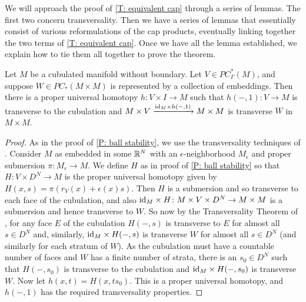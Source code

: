 We will approach the proof of \cref{T: equivalent cap} through a series of lemmas.
The first two concern transversality.
Then we have a series of lemmas that essentially consist of various reformulations of the cap products, eventually linking together the two terms of \cref{T: equivalent cap}.
Once we have all the lemma established, we explain how to tie them all together to prove the theorem.

\begin{comment}
	\begin{lemma}\red{REMOVE???:}
		Suppose $M$ is a cubulated manifold without boundary and $V \in PC^*_{\Gamma\pf}(M)$.
		Then $\id_M \times r_V \colon M \times V \to M \times M$ is transverse to the product cubulation of $M \times M$.
	\end{lemma}
	\begin{proof}
		Easy = see if I did this earlier somewhere
	\end{proof}

	\red{Note $\mc J$ commutes with $\Delta$ and switch them below.}
\end{comment}

\begin{lemma}\label{L: product transversal}
	Let $M$ be a cubulated manifold without boundary.
	Let $V \in PC^*_{\Gamma}(M)$, and suppose $W \in PC_*(M \times M)$ is represented by a collection of embeddings.
	Then there is a proper universal homotopy $h \colon V \times I \to M$ such that $h(-,1) \colon V \to M$ is transverse to the cubulation and $M \times V \xrightarrow{\mathrm{id}_M \times h(-,1)} M \times M$ is transverse $W$ in $M \times M$.
\end{lemma}

\begin{proof}
	As in the proof of \cref{P: ball stability}, we use the transversality techniques of \cite[Section 2.3]{GuPo74}.
	Consider $M$ as embedded in some $\mathbb{R}^N$ with an $\epsilon$-neighborhood $M_\epsilon$ and proper submersion $\pi \colon M_\epsilon \to M$.
	We define $H$ as in proof of \cref{P: ball stability} so that $H \colon V \times D^N \to M$ is the proper universal homotopy given by $H(x,s) = \pi(r_V(x)+\epsilon(x)s)$.
	Then $H$ is a submersion and so transverse to each face of the cubulation, and also $\mathrm{id}_M \times H \colon M \times V \times D^N \to M \times M$ is a submersion and hence transverse to $W$.
	So now by the Transversality Theorem of \cite[Section 2.3]{GuPo74}, for any face $E$ of the cubulation $H(-,s)$ is transverse to $E$ for almost all $s \in D^N$ and, similarly, $\mathrm{id}_M \times H(-,s)$ is transverse $W$ for almost all $s \in D^N$ (and similarly for each stratum of $W$).
	As the cubulation must have a countable number of faces and $W$ has a finite number of strata, there is an $s_0 \in D^N$ such that $H(-,s_0)$ is transverse to the cubulation and $\mathrm{id}_M \times H(-,s_0)$ is transverse $W$.
	Now let $h(x,t) = H(x,ts_0)$.
	This is a proper universal homotopy, and $h(-,1)$ has the required transversality properties.
\end{proof}

